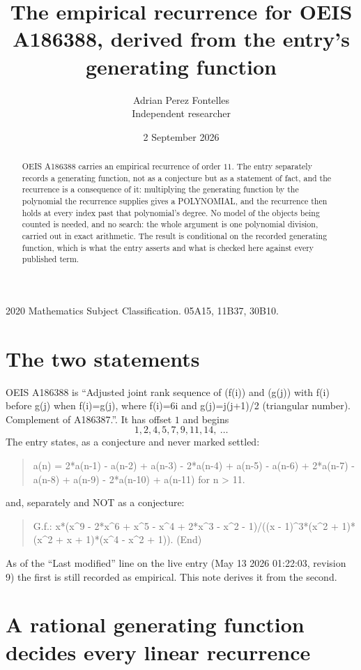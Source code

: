 \documentclass[11pt,a4paper]{article}
\title{The empirical recurrence for OEIS A186388, derived from the entry's generating function}
\author{Adrian Perez Fontelles\\ \small Independent researcher}
\date{2 September 2026}
\theoremstyle{plain}
\theoremstyle{definition}
\begin{document}
\maketitle

\begin{abstract}
OEIS A186388 carries an empirical recurrence of order $11$. The entry separately records a
generating function, not as a conjecture but as a statement of fact, and the recurrence is a
consequence of it: multiplying the generating function by the polynomial the recurrence
supplies gives a POLYNOMIAL, and the recurrence then holds at every index past that
polynomial's degree. No model of the objects being counted is needed, and no search: the
whole argument is one polynomial division, carried out in exact arithmetic. The result is
conditional on the recorded generating function, which is what the entry asserts and what is
checked here against every published term.
\end{abstract}

\noindent\small 2020 Mathematics Subject Classification. 05A15, 11B37, 30B10.\normalsize

\section{The two statements}

OEIS A186388 is ``Adjusted joint rank sequence of (f(i)) and (g(j)) with f(i) before g(j) when f(i)=g(j), where f(i)=6i and g(j)=j(j+1)/2 (triangular number).  Complement of A186387.''. It has offset $1$ and begins
\[
1, 2, 4, 5, 7, 9, 11, 14,\ \dots
\]
The entry states, as a conjecture and never marked settled:
\begin{quote}
a(n) = 2*a(n-1) - a(n-2) + a(n-3) - 2*a(n-4) + a(n-5) - a(n-6) + 2*a(n-7) - a(n-8) + a(n-9) - 2*a(n-10) + a(n-11) for n > 11.
\end{quote}
and, separately and NOT as a conjecture:
\begin{quote}
G.f.: x*(x\^{}9 - 2*x\^{}6 + x\^{}5 - x\^{}4 + 2*x\^{}3 - x\^{}2 - 1)/((x - 1)\^{}3*(x\^{}2 + 1)*(x\^{}2 + x + 1)*(x\^{}4 - x\^{}2 + 1)). (End)
\end{quote}
As of the ``Last modified'' line on the live entry (May 13 2026 01:22:03, revision 9) the first is still
recorded as empirical. This note derives it from the second.

\section{A rational generating function decides every linear recurrence}
\end{document}
